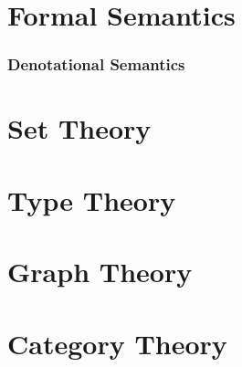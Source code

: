 \documentclass{article}
\begin{document}
\part{Formal Semantics}

\section{Denotational Semantics}

\part{Set Theory}

\part{Type Theory}

\part{Graph Theory}

\part{Category Theory}
\end{document}
